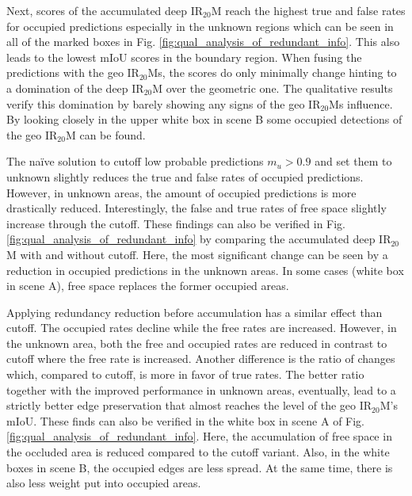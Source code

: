 Next, scores of the accumulated deep IR$_{20}$M reach the highest true and false rates for occupied predictions especially in the unknown regions which can be seen in all of the marked boxes in Fig. \ref{fig:qual_analysis_of_redundant_info}. This also leads to the lowest mIoU scores in the boundary region. When fusing the predictions with the geo IR$_{20}$Ms, the scores do only minimally change hinting to a domination of the deep IR$_{20}$M over the geometric one. The qualitative results verify this domination by barely showing any signs of the geo IR$_{20}$Ms influence. By looking closely in the upper white box in scene B some occupied detections of the geo IR$_{20}$M can be found.

The na\"ive solution to cutoff low probable predictions $m_u > 0.9$ and set them to unknown slightly reduces the true and false rates of occupied predictions. However, in unknown areas, the amount of occupied predictions is more drastically reduced. Interestingly, the false and true rates of free space slightly increase through the cutoff. These findings can also be verified in Fig. \ref{fig:qual_analysis_of_redundant_info} by comparing the accumulated deep IR$_{20}$M with and without cutoff. Here, the most significant change can be seen by a reduction in occupied predictions in the unknown areas. In some cases (white box in scene A), free space replaces the former occupied areas.

Applying redundancy reduction before accumulation has a similar effect than cutoff. The occupied rates decline while the free rates are increased. However, in the unknown area, both the free and occupied rates are reduced in contrast to cutoff where the free rate is increased. Another difference is the ratio of changes which, compared to cutoff, is more in favor of true rates. The better ratio together with the improved performance in unknown areas, eventually, lead to a strictly better edge preservation that almost reaches the level of the geo IR$_{20}$M's mIoU. These finds can also be verified in the white box in scene A of Fig. \ref{fig:qual_analysis_of_redundant_info}. Here, the accumulation of free space in the occluded area is reduced compared to the cutoff variant. Also, in the white boxes in scene B, the occupied edges are less spread. At the same time, there is also less weight put into occupied areas.

